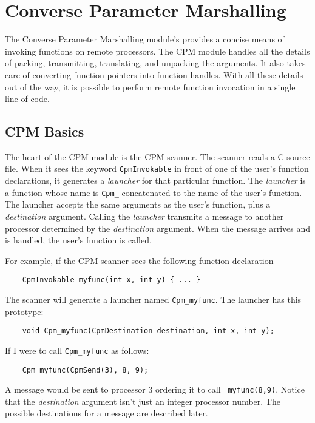 \chapter{Converse Parameter Marshalling}

The Converse Parameter Marshalling module's provides a concise means
of invoking functions on remote processors.  The CPM module handles
all the details of packing, transmitting, translating, and
unpacking the arguments.  It also takes care of converting function
pointers into function handles.  With all these details out of the
way, it is possible to perform remote function invocation in a single
line of code.

\section{CPM Basics}

The heart of the CPM module is the CPM scanner.  The scanner reads a C
source file.  When it sees the keyword {\tt CpmInvokable} in front of
one of the user's function declarations, it generates a {\it launcher}
for that particular function.  The {\it launcher} is a function whose
name is {\tt Cpm\_} concatenated to the name of the user's function.
The launcher accepts the same arguments as the user's function, plus a
{\it destination} argument.  Calling the {\it launcher} transmits a
message to another processor determined by the {\it destination}
argument.  When the message arrives and is handled, the user's
function is called.

For example, if the CPM scanner sees the following function
declaration

\begin{verbatim}
    CpmInvokable myfunc(int x, int y) { ... }
\end{verbatim}

The scanner will generate a launcher named {\tt Cpm\_myfunc}.
The launcher has this prototype:

\begin{verbatim}
    void Cpm_myfunc(CpmDestination destination, int x, int y);
\end{verbatim}

If I were to call {\tt Cpm\_myfunc} as follows:

\begin{verbatim}
    Cpm_myfunc(CpmSend(3), 8, 9);
\end{verbatim}

A message would be sent to processor 3 ordering it to call {\tt
myfunc(8,9)}.  Notice that the {\it destination} argument isn't just an
integer processor number.  The possible destinations for a message are
described later.

